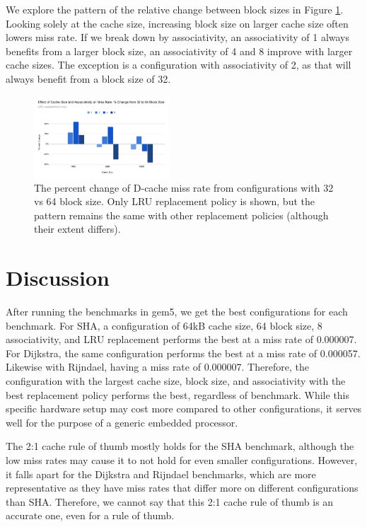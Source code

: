 \documentclass[conference]{IEEEtran}
\begin{document}
We explore the pattern of the relative change between block sizes in Figure \ref{fig:rijndael-missrate-percentchange}. Looking solely at the cache size, increasing block size on larger cache size often lowers miss rate. If we break down by associativity, an associativity of 1 always benefits from a larger block size, an associativity of 4 and 8 improve with larger cache sizes. The exception is a configuration with associativity of 2, as that will always benefit from a block size of 32.

\begin{figure}[H]
  \centering
  \includegraphics[width=0.45\textwidth]{images/rijndael_missrate_percentchange}
  \caption{The percent change of D-cache miss rate from configurations with 32 vs 64 block size. Only LRU replacement policy is shown, but the pattern remains the same with other replacement policies (although their extent differs).}
  \label{fig:rijndael-missrate-percentchange}
\end{figure}

\section{Discussion}

After running the benchmarks in gem5, we get the best configurations for each benchmark. For SHA, a configuration of 64kB cache size, 64 block size, 8 associativity, and LRU replacement performs the best at a miss rate of 0.000007. For Dijkstra, the same configuration performs the best at a miss rate of 0.000057. Likewise with Rijndael, having a miss rate of 0.000007. Therefore, the configuration with the largest cache size, block size, and associativity with the best replacement policy performs the best, regardless of benchmark. While this specific hardware setup may cost more compared to other configurations, it serves well for the purpose of a generic embedded processor.

The 2:1 cache rule of thumb mostly holds for the SHA benchmark, although the low miss rates may cause it to not hold for even smaller configurations. However, it falls apart for the Dijkstra and Rijndael benchmarks, which are more representative as they have miss rates that differ more on different configurations than SHA. Therefore, we cannot say that this 2:1 cache rule of thumb is an accurate one, even for a rule of thumb.
\end{document}
